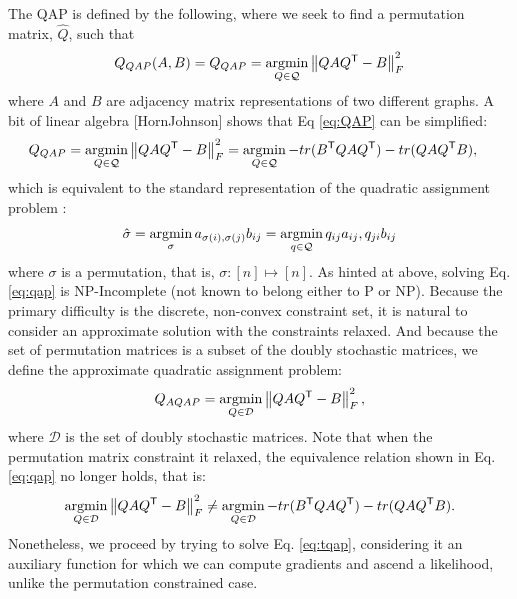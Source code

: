 \documentclass{article} %
\providecommand{\norm}[1]{\left \lVert#1 \right  \rVert}
\newcommand{\argmin}{\operatornamewithlimits{argmin}}
\newcommand{\T}{^{\ensuremath{\mathsf{T}}}}           %
\providecommand{\mc}[1]{\mathcal{#1}}
\providecommand{\mh}[1]{\hat{#1}}
\begin{document}
The QAP is defined by the following, where we seek to find a permutation matrix, $\mh{Q}$, such that
 \begin{align} \label{eq:QAP}
	Q_{QAP}(A,B)=Q_{QAP} = \argmin_{Q \in \mc{Q}} \norm{Q A Q\T - B}^2_F
\end{align}
where $A$ and $B$ are adjacency matrix representations of two different graphs.  A bit of linear algebra [HornJohnson] shows that Eq \eqref{eq:QAP} can be simplified:
\begin{align} \label{eq:qap}
	Q_{QAP} &= \argmin_{Q \in \mc{Q}} \norm{Q A Q\T - B}^2_F = \argmin_{Q \in \mc{Q}} - tr(B\T QAQ\T) - tr(QAQ\T B),			
\end{align}
which is equivalent to the standard representation of the quadratic assignment problem \cite{}:
\begin{align}
	\mh{\sigma}= \argmin_{\sigma} a_{\sigma(i), \sigma(j)} b_{ij} = \argmin_{q \in \mc{Q}} q_{ij} a_{ij}, q_{ji} b_{ij}
\end{align}
where $\sigma$ is a permutation, that is, $\sigma: [n] \mapsto [n]$.  As hinted at above, solving Eq. \eqref{eq:qap} is NP-Incomplete (not known to belong either to P or NP).  Because the primary difficulty is the discrete, non-convex constraint set, it is natural to consider an approximate solution with the constraints relaxed.  And because the set of permutation matrices is a subset of the doubly stochastic matrices, we define the approximate quadratic assignment problem:
\begin{align} \label{eq:tqap}
	Q_{AQAP} = \argmin_{Q \in \mc{D}} \norm{Q A Q\T - B}^2_F,
\end{align}
where $\mc{D}$ is the set of doubly stochastic matrices.  Note that when the permutation matrix constraint it relaxed, the equivalence relation shown in Eq. \eqref{eq:qap} no longer holds, that is:
\begin{align} \label{eq:nqap}
	\argmin_{Q \in \mc{D}} \norm{Q A Q\T - B}^2_F \neq \argmin_{Q \in \mc{D}} - tr(B\T QAQ\T) - tr(QAQ\T B).
\end{align}
Nonetheless, we proceed by trying to solve Eq. \eqref{eq:tqap}, considering it an auxiliary function for which we can compute gradients and ascend a likelihood, unlike the permutation constrained case.  
\end{document}

